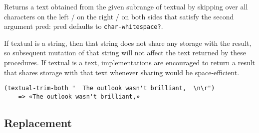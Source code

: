 \begin{entry}{%
  }

  Returns a text obtained from the given subrange
  of textual by skipping over all characters on the left / on the
  right / on both sides that satisfy the second argument pred: pred
  defaults to \texttt{char-whitespace?}.

  If textual is a string, then that string does not share any storage
  with the result, so subsequent mutation of that string will not
  affect the text returned by these procedures. If textual is a text,
  implementations are encouraged to return a result that shares
  storage with that text whenever sharing would be space-efficient.

\begin{verbatim}
(textual-trim-both "  The outlook wasn't brilliant,  \n\r")
    => «The outlook wasn't brilliant,»
\end{verbatim}
\end{entry}

\subsection{{Replacement}}\label{replacement}

